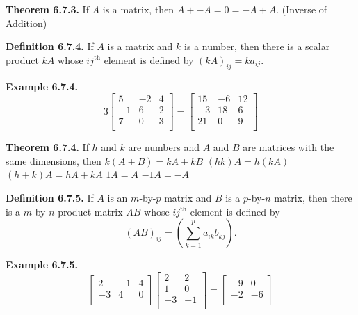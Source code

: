 \textbf{Theorem 6.7.3.}  If $A$ is a matrix, then\nl
$A + -A = \underline{0} = -A + A.$  (Inverse of Addition)\nl

\textbf{Definition 6.7.4.}  If $A$ is a matrix and $k$ is a number, then there is a scalar product $kA$ whose $ij^{\text{th}}$ element is defined by $(kA)_{ij} = ka_{ij}.$\nl


\textbf{Example 6.7.4.}
\begin{equation*}
3\left[
\begin{array}{rrr}
5 & -2 & 4\\
-1&6&2\\
7&0&3\\
\end{array}
\right]=
\left[
\begin{array}{rrr}
15 & -6 & 12\\
-3&18&6\\
21&0&9\\
\end{array}
\right]
\end{equation*}\nl

\textbf{Theorem 6.7.4.}  If $h$ and $k$ are numbers and $A$ and $B$ are matrices with the same dimensions, then \nl
$k(A\pm B) = kA \pm kB$\nl
$(hk)A = h(kA)$\nl
$(h + k)A = hA + kA$\nl
$1A = A$\nl
$-1A = -A$\nl

\textbf{Definition 6.7.5.} If $A$ is an $m$-by-$p$ matrix and $B$ is a $p$-by-$n$ matrix, then there is a $m$-by-$n$ product matrix $AB$ whose $ij^{\text{th}}$ element is defined by
\[
(AB)_{ij} = (\sum_{k=1}^{p}a_{ik}b_{kj}).
\]\nl

\textbf{Example 6.7.5.}\nl
\begin{equation*}
\left[
\begin{array}{rrr}
2 & -1 & 4\\
-3&4&0\\
\end{array}
\right]
\left[
\begin{array}{rr}
2 & 2\\
1&0\\
-3&-1\\
\end{array}
\right]=
\left[
\begin{array}{rr}
-9&0\\
-2&-6\\
\end{array}
\right]
\end{equation*}\nl

